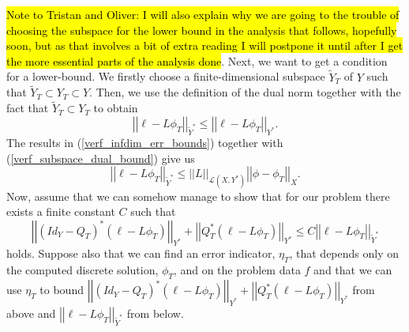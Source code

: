 \documentclass[12pt,a4paper]{article}
\theoremstyle{definition}
\begin{document}
\hl{Note to Tristan and Oliver: I will also explain why we are going to the trouble of choosing the subspace for the lower bound in the analysis that follows, hopefully soon, but as that involves a bit of extra reading I will postpone it until after I get the more essential parts of the analysis done}. Next, we want to get a condition for a lower-bound.  We firstly choose a finite-dimensional subspace $\widetilde{Y}_T$ of $Y$ such that $\widetilde{Y}_T\subset Y_T\subset Y$.  Then, we use the definition of the dual norm 
together with the fact that $\widetilde{Y}_T\subset Y_T$ to obtain
\begin{equation}\label{verf_subspace_dual_bound}
\left|\left| \ell-L\phi_T\right|\right|_{\widetilde{Y}^*}\leq \left|\left| \ell-L\phi_T\right|\right|_{Y^*}.
\end{equation}
The results in (\ref{verf_infdim_err_bounds}) together with (\ref{verf_subspace_dual_bound}) give us
\begin{equation}
\left|\left| \ell-L\phi_T\right|\right|_{\widetilde{Y}^*}\leq \left|\left|L\right|\right|_{\mathcal{L}\left(X,Y^*\right)}\left|\left|\phi-\phi_T\right|\right|_X.
\end{equation}
Now, assume that we can somehow manage to show that for our problem there exists a finite constant $C$ such that
\begin{equation}
\left|\left| \left(Id_Y-Q_T\right)^*\left(\ell-L\phi_T\right)\right|\right|_{Y^*} +\left|\left| Q_T^*\left(\ell-L\phi_T\right)\right|\right|_{Y^*}\leq C \left|\left| \ell-L\phi_T\right|\right|_{\widetilde{Y}^*}
\end{equation}
holds. Suppose also that we can find an error indicator, $\eta_T$, that depends only on the computed discrete solution, $\phi_T$, and on the problem data $f$ and that we can use $\eta_T$ to bound $\left|\left| \left(Id_Y-Q_T\right)^*\left(\ell-L\phi_T\right)\right|\right|_{Y^*} +\left|\left| Q_T^*\left(\ell-L\phi_T\right)\right|\right|_{Y^*}$ from above and $\left|\left| \ell-L\phi_T\right|\right|_{\widetilde{Y}^*}$ from below.  
\end{document}
